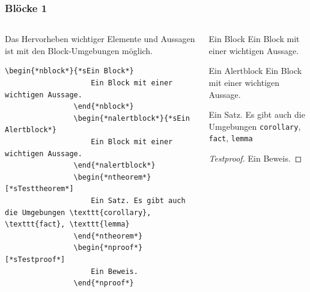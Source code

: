 \documentclass[german,notoc,draft]{tudbeamer}%
\begin{document}
\begin{frame}[fragile]
	\frametitle{Blöcke 1}

	\begin{columns}[T,onlytextwidth]
		\begin{column}[T]{.475\textwidth}
			Das Hervorheben wichtiger Elemente und Aussagen ist mit den Block-Umgebungen möglich.
			\begin{lstlisting}[gobble=8,style=latex]			
				\begin{*nblock*}{*sEin Block*}
					Ein Block mit einer wichtigen Aussage.
				\end{*nblock*}
				\begin{*nalertblock*}{*sEin Alertblock*}
					Ein Block mit einer wichtigen Aussage.
				\end{*nalertblock*}
				\begin{*ntheorem*}[*sTesttheorem*]
					Ein Satz. Es gibt auch die Umgebungen \texttt{corollary}, \texttt{fact}, \texttt{lemma}
				\end{*ntheorem*}
				\begin{*nproof*}[*sTestproof*]
					Ein Beweis.
				\end{*nproof*}
			\end{lstlisting} 
		\end{column}
		\begin{column}[T]{.475\textwidth}
			\begin{block}{Ein Block}
				Ein Block mit einer wichtigen Aussage.
			\end{block}
			\begin{alertblock}{Ein Alertblock}
				Ein Block mit einer wichtigen Aussage.
			\end{alertblock}
			\begin{theorem}[Testtheorem]
				Ein Satz. Es gibt auch die Umgebungen \texttt{corollary}, \texttt{fact}, \texttt{lemma}
			\end{theorem}
			\begin{proof}[Testproof]
				Ein Beweis.
			\end{proof}
		\end{column}
	\end{columns}
\end{frame}
\end{document}
